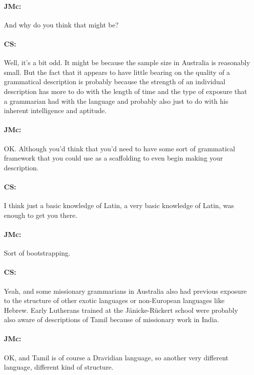 \documentclass[output=paper]{langscibook}
\begin{document}
\paragraph*{JMc:}  And why do you think that might be?


\paragraph*{CS:}  Well, it’s a bit odd. It might be because the sample size in Australia is reasonably small. But the fact that it appears to have little bearing on the quality of a grammatical description is probably because the strength of an individual description has more to do with the length of time and the type of exposure that a grammarian had with the language and probably also just to do with his inherent intelligence and aptitude.


\paragraph*{JMc:}   OK. Although you’d think that you’d need to have some sort of grammatical framework that you could use as a scaffolding to even begin making your description.


\paragraph*{CS:}  I think just a basic knowledge of Latin, a very basic knowledge of Latin, was enough to get you there.


\paragraph*{JMc:}  Sort of bootstrapping.


\paragraph*{CS:}  Yeah, and some missionary grammarians in Australia also had previous exposure to the structure of other exotic languages or non-European languages like Hebrew. Early Lutherans trained at the Jänicke-Rückert school were probably also aware of descriptions of Tamil because of missionary work in India.


\paragraph*{JMc:}  OK, and Tamil is of course a Dravidian language, so another very different language, different kind of structure.
\end{document}
